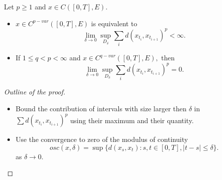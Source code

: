 \begin{proposition}
    Let $p \geq 1$ and $x \in C([0,T], E)$.
    \begin{itemize}
        \item $x \in C^{p-var}([0,T], E)$ is equivalent to
        \begin{equation}
            \lim_{\delta \rightarrow 0} \sup_{D_\delta} \sum_i d(x_{t_i}, x_{t_{i+1}})^p < \infty.
        \end{equation}
        \item If $1 \leq q < p < \infty$ and $x \in C^{q-var}([0,T], E),$ then
        \begin{equation}
            \lim_{\delta \rightarrow 0} \sup_{D_\delta} \sum_i d(x_{t_i}, x_{t_{i+1}})^p = 0.
        \end{equation}
    \end{itemize}
\end{proposition}
\begin{proof}[Outline of the proof]
    \begin{itemize}
        \item Bound the contribution of intervals with size larger then $\delta$ in $\sum d(x_{t_i}, x_{t_{i+1}})^p$ using their maximum and their quantity.
        \item Use the convergence to zero of the modulus of continuity 
        \begin{equation}
            osc(x, \delta) = \sup \{ d(x_s, x_t): s,t \in [0,T], |t - s| \leq \delta \}.
        \end{equation}
        as $\delta \rightarrow 0.$
    \end{itemize}
\end{proof}

